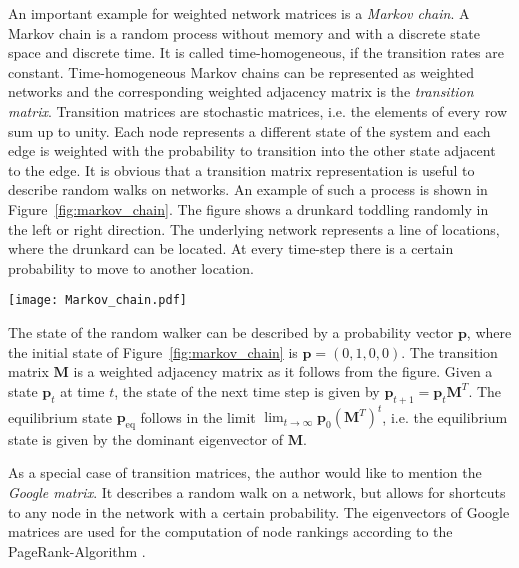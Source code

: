 An important example for weighted network matrices is a \emph{Markov chain}.
A Markov chain is a random process without memory and with a discrete state space and discrete time.
It is called time-homogeneous, if the transition rates are constant.
Time-homogeneous Markov chains can be represented as weighted networks and the corresponding weighted adjacency matrix is the \emph{transition matrix}.
Transition matrices are stochastic matrices, i.e. the elements of every row sum up to unity.
Each node represents a different state of the system and each edge is weighted with the probability to transition into the other state adjacent to the edge.
It is obvious that a transition matrix representation is useful to describe random walks on networks.
An example of such a process is shown in Figure~\ref{fig:markov_chain}.
The figure shows a drunkard toddling randomly in the left or right direction.
The underlying network represents a line of locations, where the drunkard can be located.
At every time-step there is a certain probability to move to another location.
%
\begin{SCfigure}%
\texttt{[image: Markov\_chain.pdf]}
\caption{Trajectory of a toddling drunk man as an example of a Markov chain.
At every location there is a probability for the drunkard to go left or right.
The node rightmost node is an absorbing state and could model a park bench.
Weights at arrowheads mark the transition probability.
(inspired by \citep{Aldous_book}).}
\label{fig:markov_chain}
\end{SCfigure}
%
The state of the random walker can be described by a probability vector $\mathbf{p}$, where the initial state of Figure~\ref{fig:markov_chain} is $\mathbf{p}=(0,1,0,0)$.
The transition matrix $\mathbf{M}$ is a weighted adjacency matrix as it follows from the figure.
Given a state $\mathbf{p}_{t}$ at time $t$, the state of the next time step is given by $\mathbf{p}_{t+1}=\mathbf{p}_t \mathbf{M}^T$.
The equilibrium state $\mathbf{p}_\mathrm{eq}$ follows in the limit $\lim _{t\rightarrow \infty } \mathbf{p}_0 (\mathbf{M}^T)^t$, i.e. the equilibrium state is given by the dominant eigenvector of $\mathbf{M}$.

As a special case of transition matrices, the author would like to mention the \emph{Google matrix}.
It describes a random walk on a network, but allows for shortcuts to any node in the network with a certain probability.
The eigenvectors of Google matrices are used for the computation of node rankings according to the PageRank-Algorithm \citep{PageRank:}.

